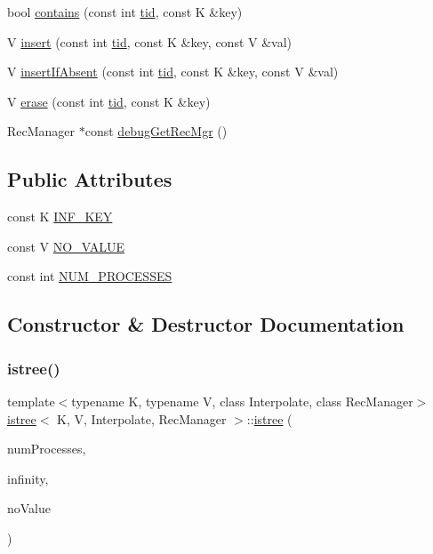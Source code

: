 \begin{DoxyCompactItemize}
bool \hyperlink{classistree_a5b335867433d58dd82595a39771c79fa}{contains} (const int \hyperlink{microbench_2main_8cpp_a9ca9869868fe7e7a38a921cc7de4103f}{tid}, const K \&key)
\item 
V \hyperlink{classistree_a03da2f3c8284777c01360269f7f04031}{insert} (const int \hyperlink{microbench_2main_8cpp_a9ca9869868fe7e7a38a921cc7de4103f}{tid}, const K \&key, const V \&val)
\item 
V \hyperlink{classistree_a5831a1cedefe4d8bd4c3ef136724a1d8}{insert\+If\+Absent} (const int \hyperlink{microbench_2main_8cpp_a9ca9869868fe7e7a38a921cc7de4103f}{tid}, const K \&key, const V \&val)
\item 
V \hyperlink{classistree_aebb610663d355375bf057e7cb04433cc}{erase} (const int \hyperlink{microbench_2main_8cpp_a9ca9869868fe7e7a38a921cc7de4103f}{tid}, const K \&key)
\item 
Rec\+Manager $\ast$const \hyperlink{classistree_a1f3d3dfef2900f634a291665c2294e02}{debug\+Get\+Rec\+Mgr} ()
\end{DoxyCompactItemize}
\subsection*{Public Attributes}
\begin{DoxyCompactItemize}
\item 
const K \hyperlink{classistree_a82526895c0658e507b6877d52143040f}{I\+N\+F\+\_\+\+K\+EY}
\item 
const V \hyperlink{classistree_aabacf063ee71242dfc03db8aea51c0c7}{N\+O\+\_\+\+V\+A\+L\+UE}
\item 
const int \hyperlink{classistree_a7a79626fbc040b5ee2958dab265d1254}{N\+U\+M\+\_\+\+P\+R\+O\+C\+E\+S\+S\+ES}
\end{DoxyCompactItemize}


\subsection{Constructor \& Destructor Documentation}
\mbox{\label{classistree_a73f132b3bc40923a0f0b57b9869a1554}} 
\subsubsection{\texorpdfstring{istree()}{istree()}\hspace{0.1cm}{\footnotesize\ttfamily [1/2]}}
{\footnotesize\ttfamily template$<$typename K, typename V, class Interpolate, class Rec\+Manager$>$ \\
\hyperlink{classistree}{istree}$<$ K, V, Interpolate, Rec\+Manager $>$\+::\hyperlink{classistree}{istree} (\begin{DoxyParamCaption}\item[{const int}]{num\+Processes,  }\item[{const K}]{infinity,  }\item[{const V}]{no\+Value }\end{DoxyParamCaption})\hspace{0.3cm}{\ttfamily [inline]}}

